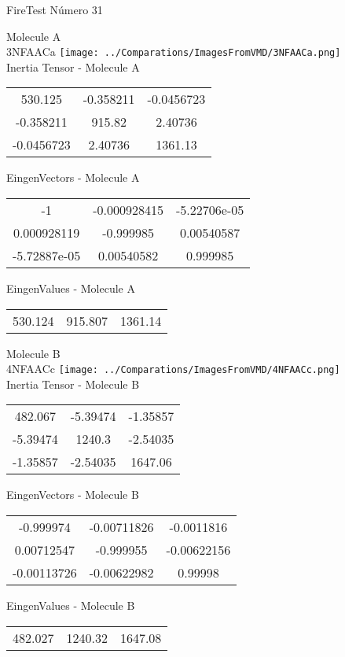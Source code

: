 \vtab[-2cm]
\begin{center}
{\large FireTest \tab Número 31}
\end{center}
\begin{multicols}{2}
\begin{center}

Molecule A \\ 
3NFAACa
\texttt{[image: ../Comparations/ImagesFromVMD/3NFAACa.png]}
\\
Inertia Tensor - Molecule A \\
\vtab

\begin{tabular}{|c c c|}
530.125	 & 	-0.358211	 & 	-0.0456723	 \\
-0.358211	 & 	915.82	 & 	2.40736	 \\
-0.0456723	 & 	2.40736	 & 	1361.13
\end{tabular}

\vtab
 EingenVectors - Molecule A     \\
\vtab
\begin{tabular}{|c c c|}
-1	 & 	-0.000928415	 & 	-5.22706e-05	 \\
0.000928119	 & 	-0.999985	 & 	0.00540587	 \\
-5.72887e-05	 & 	0.00540582	 & 	0.999985
\end{tabular}

\vtab
 EingenValues - Molecule A     \\
\vtab
\begin{tabular}{|c c c|}
530.124	 & 	915.807	 & 	1361.14	 \\
\end{tabular}
\columnbreak

Molecule B \\ 
4NFAACc
\texttt{[image: ../Comparations/ImagesFromVMD/4NFAACc.png]}
\\
Inertia Tensor - Molecule B \\
\vtab

\begin{tabular}{|c c c|}
482.067	 & 	-5.39474	 & 	-1.35857	 \\
-5.39474	 & 	1240.3	 & 	-2.54035	 \\
-1.35857	 & 	-2.54035	 & 	1647.06
\end{tabular}

\vtab
 EingenVectors - Molecule B     \\
\vtab
\begin{tabular}{|c c c|}
-0.999974	 & 	-0.00711826	 & 	-0.0011816	 \\
0.00712547	 & 	-0.999955	 & 	-0.00622156	 \\
-0.00113726	 & 	-0.00622982	 & 	0.99998
\end{tabular}

\vtab
 EingenValues - Molecule B     \\
\vtab
\begin{tabular}{|c c c|}
482.027	 & 	1240.32	 & 	1647.08	 \\
\end{tabular}

\end{center}
\end{multicols}
